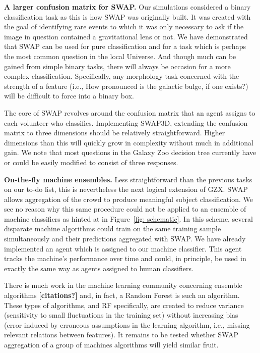 \documentclass[twocolumn]{aastex6}
\begin{document}
\textbf{A larger confusion matrix for SWAP.}
Our simulations considered a binary classification task as this is how SWAP was 
originally built. It was created with the goal of identifying rare events to which 
it was only necessary to ask if the image in question contained a gravitational lens
or not. We have demonstrated that SWAP can be used for pure classification and 
for a task which is perhaps the most common question in the local Universe. 
And though much can be gained from simple binary tasks, there will always be 
occasion for a more complex classification. Specifically, any morphology task
concerned with the strength of a feature (i.e., How pronounced is the galactic bulge, 
if one exists?) will be difficult to force into a binary box. 

The core of SWAP revolves around the confusion matrix that an agent assigns to each
volunteer who classifies. Implementing SWAP3D, extending the confusion matrix to
three dimensions should be relatively straightforward. Higher dimensions than this
will quickly grow in complexity without much in additional gain. We note that most 
questions in the Galaxy Zoo decision tree currently have or could be easily modified
to consist of three responses.


\textbf{On-the-fly machine ensembles.}
Less straightforward than the previous tasks on our to-do list, this is nevertheless 
the next logical extension of GZX. SWAP allows aggregation of the crowd to produce 
meaningful subject classification. We see no reason why this same procedure could 
not be applied to an ensemble of machine classifiers as hinted at in Figure~\ref{fig: schematic}.
In this scheme, several disparate machine algorithms could train on the same training sample
simultaneously and their predictions aggregated with SWAP. We have already 
implemented an agent which is assigned to our machine classifier. This agent
tracks the machine's performance over time and could, in principle, be used in 
exactly the same way as agents assigned to human classifiers. 

There is much work in the machine learning community concerning ensemble algorithms \textbf{[citations?]}
and, in fact, a Random Forest is such an algorithm. These types of algorithms,
and RF specifically, are created to reduce variance (sensitivity to small fluctuations
in the training set) without increasing bias (error induced by erroneous assumptions
in the learning algorithm, i.e., missing relevant relations between features). 
It remains to be tested whether SWAP aggregation of a group of machines algorithms
 will yield similar fruit. 
\end{document}
